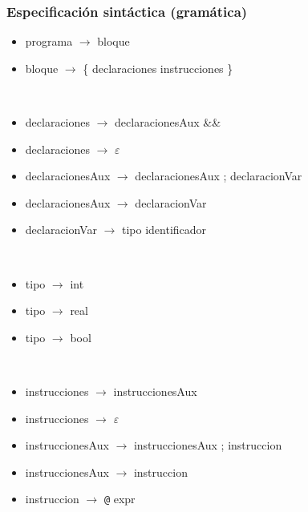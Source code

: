 \documentclass[11pt]{article}
\begin{document}
            \subsubsection{Especificación sintáctica (gramática)}
            \begin{itemize}
                \item programa $\rightarrow$ bloque
                \item bloque $\rightarrow$ \{ declaraciones instrucciones \}
            \end{itemize}
            \
            \begin{itemize}
                \item declaraciones $\rightarrow$ declaracionesAux \&\&
                \item declaraciones $\rightarrow$ $\varepsilon$
                \item declaracionesAux $\rightarrow$ declaracionesAux ; declaracionVar
                \item declaracionesAux $\rightarrow$ declaracionVar
                \item declaracionVar $\rightarrow$ tipo identificador
            \end{itemize}
            \ 
            \begin{itemize}
                \item tipo $\rightarrow$ int
                \item tipo $\rightarrow$ real
                \item tipo $\rightarrow$ bool
            \end{itemize}
            \ 
            \begin{itemize}
                \item instrucciones $\rightarrow$ instruccionesAux
                \item instrucciones $\rightarrow$ $\varepsilon$
                \item instruccionesAux $\rightarrow$ instruccionesAux ; instruccion
                \item instruccionesAux $\rightarrow$ instruccion
                \item instruccion $\rightarrow$ \verb|@| expr 
            \end{itemize}
            
\end{document}

